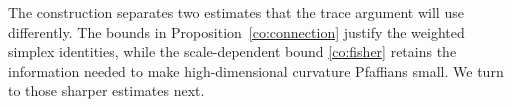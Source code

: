 The construction separates two estimates that the trace argument will
use differently.  The bounds in Proposition~\ref{co:connection} justify
the weighted simplex identities, while the scale-dependent bound
\eqref{co:fisher} retains the information needed to make high-dimensional
curvature Pfaffians small.  We turn to those sharper estimates next.
